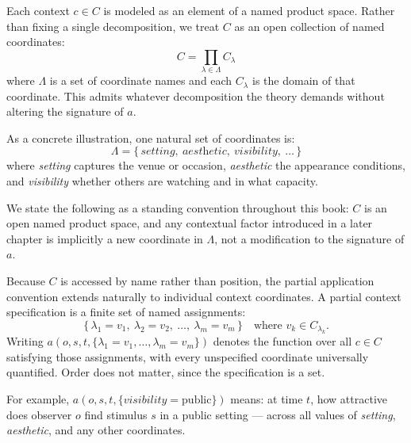 Each context $c \in C$ is modeled as an element of a named product space.
Rather than fixing a single decomposition, we treat $C$ as an open collection of named coordinates:
\[
  C = \prod_{\lambda \in \Lambda} C_\lambda
\]
where $\Lambda$ is a set of coordinate names and each $C_\lambda$ is the domain of that coordinate.
This admits whatever decomposition the theory demands without altering the signature of $a$.

As a concrete illustration, one natural set of coordinates is:
\[
  \Lambda = \{\, \textit{setting},\ \textit{aesthetic},\ \textit{visibility},\ \dots \,\}
\]
where \textit{setting} captures the venue or occasion, \textit{aesthetic} the appearance conditions, and \textit{visibility} whether others are watching and in what capacity.

\begin{remark}
We state the following as a standing convention throughout this book: $C$ is an open named product space, and any contextual factor introduced in a later chapter is implicitly a new coordinate in $\Lambda$, not a modification to the signature of $a$.
\end{remark}

Because $C$ is accessed by name rather than position, the partial application convention extends naturally to individual context coordinates.
A partial context specification is a finite set of named assignments:
\[
  \{\, \lambda_1 = v_1,\ \lambda_2 = v_2,\ \dots,\ \lambda_m = v_m \,\}
  \quad \text{where } v_k \in C_{\lambda_k}.
\]
Writing $a(o, s, t, \{\lambda_1 = v_1, \dots, \lambda_m = v_m\})$ denotes the function over all $c \in C$ satisfying those assignments, with every unspecified coordinate universally quantified.
Order does not matter, since the specification is a set.

For example, $a(o, s, t, \{\textit{visibility} = \text{public}\})$ means: at time $t$, how attractive does observer $o$ find stimulus $s$ in a public setting --- across all values of \textit{setting}, \textit{aesthetic}, and any other coordinates.

